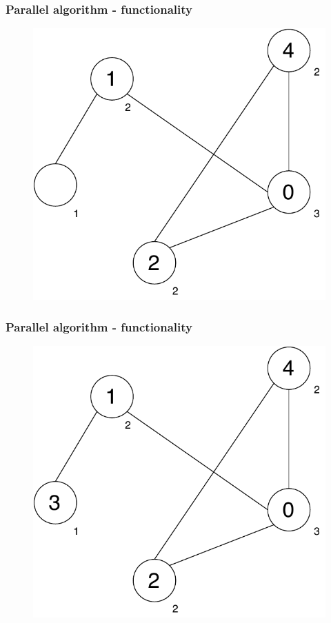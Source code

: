 \documentclass[11pt,xcolor=pdflatex]{beamer}
\begin{document}
\begin{frame}\frametitle{Parallel algorithm - functionality}

\begin{figure}
   \includegraphics[width=0.6\linewidth]{graph_4colored.pdf}
\end{figure}

\end{frame}


\begin{frame}\frametitle{Parallel algorithm - functionality}

\begin{figure}
   \includegraphics[width=0.6\linewidth]{graph_5colored.pdf}
\end{figure}

\end{frame}

\end{document}
